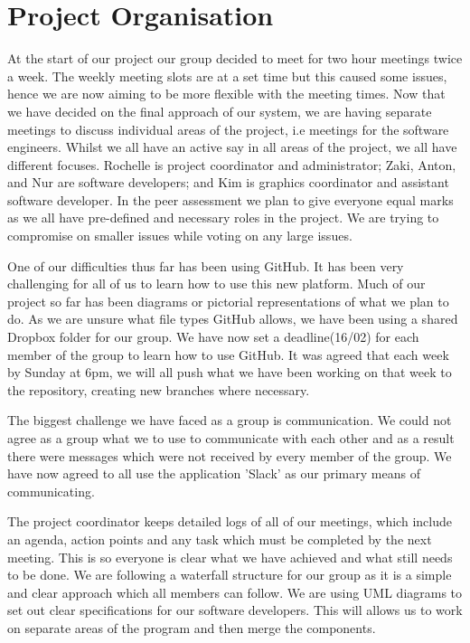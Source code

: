 \documentclass[11pt]{article}
\begin{document}
	
	\section{Project Organisation}
		At the start of our project our group decided to meet for two hour meetings twice a week. 
		The weekly meeting slots are at a set time but this caused some issues, hence we are now aiming to be more flexible with the meeting times. 
		Now that we have decided on the final approach of our system, we are having separate meetings to discuss individual areas of the project, i.e meetings for the software engineers. 
		Whilst we all have an active say in all areas of the project, we all have different focuses. 
		Rochelle is project coordinator and administrator; Zaki, Anton, and Nur are software developers; and Kim is graphics coordinator and assistant software developer. 
		In the peer assessment we plan to give everyone equal marks as we all have pre-defined and necessary roles in the project. 
		We are trying to compromise on smaller issues while voting on any large issues. 
		 
		One of our difficulties thus far has been using GitHub. 
		It has been very challenging for all of us to learn how to use this new platform. 
		Much of our project so far has been diagrams or pictorial representations of what we plan to do. 
		As we are unsure what file types GitHub allows, we have been using a shared Dropbox folder for our group. 
		We have now set a deadline(16/02) for each member of the group to learn how to use GitHub. 
		It was agreed that each week by Sunday at 6pm, we will all push what we have been working on that week to the repository, creating new branches where necessary. 
		
		The biggest challenge we have faced as a group is communication. 
		We could not agree as a group what we to use to communicate with each other and as a result there were messages which were not received by every member of the group. 
		We have now agreed to all use the application 'Slack' as our primary means of communicating. 
		
		The project coordinator keeps detailed logs of all of our meetings, which include an agenda, action points and any task which must be completed by the next meeting. 
		This is so everyone is clear what we have achieved and what still needs to be done. 
		We are following a waterfall structure for our group as it is a simple and clear approach which all members can follow. 
		We are using UML diagrams to set out clear specifications for our software developers. 
		This will allows us to work on separate areas of the program and then merge the components.  
	
\end{document}
